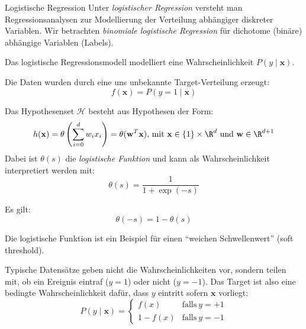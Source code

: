 \begin{defi}{Logistische Regression}
    Unter \emph{logistischer Regression} versteht man Regressionsanalysen zur Modellierung der Verteilung abhängiger diskreter Variablen.
    Wir betrachten \emph{binomiale logistische Regression} für dichotome (binäre) abhängige Variablen (Labels).

    Das logistische Regressionsmodell modelliert eine Wahrscheinlichkeit $P(y \mid \mathbf{x})$.

    Die Daten wurden durch eine uns unbekannte Target-Verteilung erzeugt:
    \[
        f(\mathbf{x}) = P(y = 1 \mid \mathbf{x})
    \]

    Das Hypothesenset $\mathcal{H}$ besteht aus Hypothesen der Form:
    \[
        h(\mathbf{x}) = \theta \left( \sum_{i=0}^d w_i x_i \right) = \theta (\mathbf{w}^T \mathbf{x}), \, \text{mit} \ \mathbf{x} \in \{1\} \times \R^d \ \text{und} \ \mathbf{w} \in \R^{d+1}
    \]
    Dabei ist $\theta(s)$ die \emph{logistische Funktion} und kann als Wahrscheinlichkeit interpretiert werden mit:
    \[
        \theta(s) = \frac{1}{1 + \exp(-s)}
    \]

    Es gilt:
    \[
        \theta(-s) = 1-\theta(s)
    \]

    \begin{center}
    \end{center}

    Die logistische Funktion ist ein Beispiel für einen \enquote{weichen Schwellenwert} (soft threshold).

    Typische Datensätze geben nicht die Wahrscheinlichkeiten vor, sondern teilen mit, ob ein Ereignis eintraf ($y = 1$) oder nicht ($y = -1$).
    Das Target ist also eine bedingte Wahrscheinlichkeit dafür, dass $y$ eintritt sofern $\mathbf{x}$ vorliegt:
    \[
        P(y \mid \mathbf{x}) = \begin{cases}
            f(x)     & \text{falls} \ y = +1 \\
            1 - f(x) & \text{falls} \ y = -1
        \end{cases}
    \]
\end{defi}

